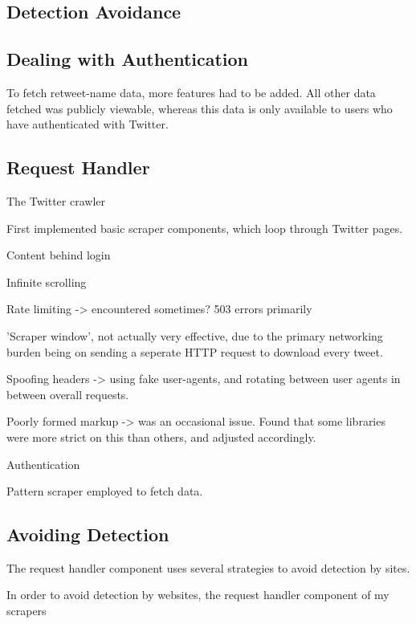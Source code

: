 \subsection{Detection Avoidance}



\subsection{Dealing with Authentication}

To fetch retweet-name data, more features had to be added. All other data fetched was publicly viewable, whereas this data is only available to users who have authenticated with Twitter.

\subsection{Request Handler}

The Twitter crawler 

First implemented basic scraper components, which loop through Twitter pages.



Content behind login

Infinite scrolling

Rate limiting -> encountered sometimes? 503 errors primarily

'Scraper window', not actually very effective, due to the primary networking burden being on sending a seperate HTTP request to download every tweet.

Spoofing headers -> using fake user-agents, and rotating between user agents in between overall requests.

Poorly formed markup -> was an occasional issue. Found that some libraries were more strict on this than others, and adjusted accordingly.

Authentication

Pattern scraper employed to fetch data. 

\subsection{Avoiding Detection}

The request handler component uses several strategies to avoid detection by sites. 

In order to avoid detection by websites, the request handler component of my scrapers 

